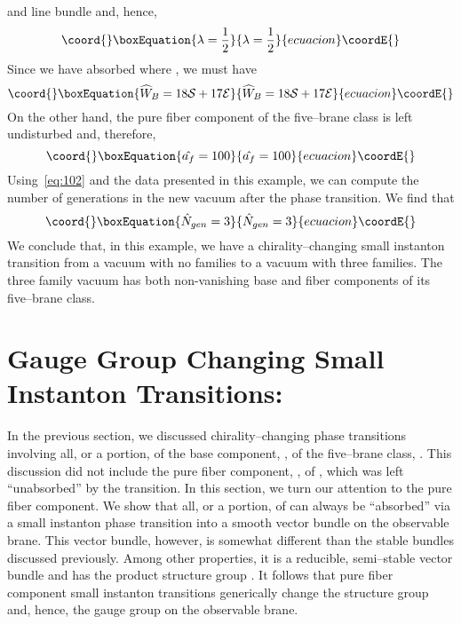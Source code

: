 \documentclass[a4paper,12pt]{article}
\numberwithin{equation}{section}
\def\cE{{\mathcal E}}
\def\cN{{\mathcal N}}
\def\cS{{\mathcal S}}
\theoremstyle{plain}
\begin{document}
and line bundle \myHighlight{$\widehat{\cN}=\cN$}\coordHE{} and, hence,
\begin{equation}\coord{}\boxEquation{
\lambda=\frac{1}{2}
\label{eq:123}
}{
\lambda=\frac{1}{2}
}{ecuacion}\coordE{}\end{equation}
Since we have absorbed \coordHE{} where \myHighlight{$z=\cE$}\coordHE{}, we must have
\begin{equation}\coord{}\boxEquation{
\widehat{W}_{B}=18\cS+17\cE
\label{eq:124}
}{
\widehat{W}_{B}=18\cS+17\cE
}{ecuacion}\coordE{}\end{equation}
On the other hand, the pure fiber component of the five--brane class is left
undisturbed and, therefore,
\begin{equation}\coord{}\boxEquation{
\hat{a_{f}}=100
\label{eq:125}
}{
\hat{a_{f}}=100
}{ecuacion}\coordE{}\end{equation}
Using~\eqref{eq:102} and the data presented in this example, we can compute
the number of generations in the new vacuum after the phase transition. We
find that
\begin{equation}\coord{}\boxEquation{
\hat{N}_{gen}=3
\label{eq:126}
}{
\hat{N}_{gen}=3
}{ecuacion}\coordE{}\end{equation}
We conclude that, in this example, we have a chirality--changing small
instanton transition from a vacuum with no families to a vacuum with three
families. The three family vacuum has both non-vanishing 
base and fiber components of its five--brane class.


\section{Gauge Group Changing Small Instanton Transitions:}


In the previous section, we discussed chirality--changing 
phase transitions involving all, or a portion, of the base component, 
\coordHE{}, of the five--brane class, \coordHE{}. This discussion did not include the pure
fiber component, \coordHE{}, of \coordHE{}, which was left ``unabsorbed'' by the
transition. In this section, we turn our attention to the pure fiber
component. We show that all, or a portion, of \coordHE{} 
can always be ``absorbed'' via a small instanton
phase transition into a smooth vector bundle on the observable brane. This
vector bundle, however, is somewhat different than the stable
\coordHE{} bundles discussed previously. Among other properties, it is a 
reducible, semi--stable vector bundle and has the product 
structure group \coordHE{}. 
It follows that pure fiber component small instanton transitions generically 
change the structure group and, hence, the gauge group on the observable
brane.
\end{document}
